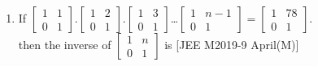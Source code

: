 \documentclass[journal,,12pt,twocolumn]{IEEEtran}
\theoremstyle{remark}
\begin{document}
\begin{enumerate}
\begin{enumerate}
\end{enumerate} 
\item If $\begin{bmatrix}
    1 & 1 \\
    0 & 1
\end{bmatrix}$.$\begin{bmatrix}
    1 & 2 \\
    0 & 1
\end{bmatrix}$.$\begin{bmatrix}
    1 & 3 \\
    0 & 1
\end{bmatrix}$\dots $\begin{bmatrix}
    1 & n-1 \\
    0 & 1
\end{bmatrix}$$=$$\begin{bmatrix}
    1 & 78 \\
    0 & 1
\end{bmatrix}$.\\
then the inverse of $\begin{bmatrix}
    1 & n \\
    0 & 1
\end{bmatrix}$ is 
\hfill{[JEE M2019-9 April(M)]} 
\begin{enumerate}
\end{enumerate}
\end{enumerate}
\end{document}

